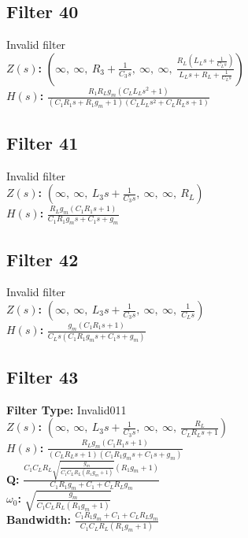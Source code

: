 \documentclass{article}
\begin{document}
\subsection*{Filter 40}
Invalid filter \\ 
\textbf{$Z(s)$:} $\left( \infty, \  \infty, \  R_{3} + \frac{1}{C_{3} s}, \  \infty, \  \infty, \  \frac{R_{L} \left(L_{L} s + \frac{1}{C_{L} s}\right)}{L_{L} s + R_{L} + \frac{1}{C_{L} s}}\right)$ \\ 
\textbf{$H(s)$:} $\frac{R_{1} R_{L} g_{m} \left(C_{L} L_{L} s^{2} + 1\right)}{\left(C_{1} R_{1} s + R_{1} g_{m} + 1\right) \left(C_{L} L_{L} s^{2} + C_{L} R_{L} s + 1\right)}$ \\ 
\subsection*{Filter 41}
Invalid filter \\ 
\textbf{$Z(s)$:} $\left( \infty, \  \infty, \  L_{3} s + \frac{1}{C_{3} s}, \  \infty, \  \infty, \  R_{L}\right)$ \\ 
\textbf{$H(s)$:} $\frac{R_{L} g_{m} \left(C_{1} R_{1} s + 1\right)}{C_{1} R_{1} g_{m} s + C_{1} s + g_{m}}$ \\ 
\subsection*{Filter 42}
Invalid filter \\ 
\textbf{$Z(s)$:} $\left( \infty, \  \infty, \  L_{3} s + \frac{1}{C_{3} s}, \  \infty, \  \infty, \  \frac{1}{C_{L} s}\right)$ \\ 
\textbf{$H(s)$:} $\frac{g_{m} \left(C_{1} R_{1} s + 1\right)}{C_{L} s \left(C_{1} R_{1} g_{m} s + C_{1} s + g_{m}\right)}$ \\ 
\subsection*{Filter 43}
\textbf{Filter Type:} Invalid011 \\ 
\textbf{$Z(s)$:} $\left( \infty, \  \infty, \  L_{3} s + \frac{1}{C_{3} s}, \  \infty, \  \infty, \  \frac{R_{L}}{C_{L} R_{L} s + 1}\right)$ \\ 
\textbf{$H(s)$:} $\frac{R_{L} g_{m} \left(C_{1} R_{1} s + 1\right)}{\left(C_{L} R_{L} s + 1\right) \left(C_{1} R_{1} g_{m} s + C_{1} s + g_{m}\right)}$ \\ 
\textbf{Q:} $\frac{C_{1} C_{L} R_{L} \sqrt{\frac{g_{m}}{C_{1} C_{L} R_{L} \left(R_{1} g_{m} + 1\right)}} \left(R_{1} g_{m} + 1\right)}{C_{1} R_{1} g_{m} + C_{1} + C_{L} R_{L} g_{m}}$ \\ 
\textbf{$\omega_0$:} $\sqrt{\frac{g_{m}}{C_{1} C_{L} R_{L} \left(R_{1} g_{m} + 1\right)}}$ \\ 
\textbf{Bandwidth:} $\frac{C_{1} R_{1} g_{m} + C_{1} + C_{L} R_{L} g_{m}}{C_{1} C_{L} R_{L} \left(R_{1} g_{m} + 1\right)}$ \\ 
\end{document}
